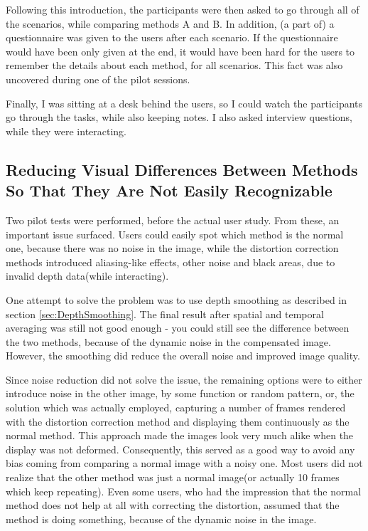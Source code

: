 \documentclass[]{article}
\begin{document}
Following this introduction, the participants were then asked to go through all of the scenarios, while comparing methods A and B. In addition, (a part of) a  questionnaire was given to the users after each scenario. If the questionnaire would have been only given at the end, it would have been hard for the users to remember the details about each method, for all scenarios. This fact was also uncovered during one of the pilot sessions.

Finally, I was sitting at a desk behind the users, so I could watch the participants go through the tasks, while also keeping notes. I also asked interview questions, while they were interacting.  

\subsection{Reducing Visual Differences Between Methods So That They Are Not Easily Recognizable}

Two pilot tests were performed, before the actual user study. From these, an important issue surfaced. Users could easily spot which method is the normal one, because there was no noise in the image, while the distortion correction methods introduced aliasing-like effects, other noise and black areas, due to invalid depth data(while interacting). 

One attempt to solve the problem was to use depth smoothing as described in section \ref{sec:DepthSmoothing}. The final result after spatial and temporal averaging was still not good enough - you could still see the difference between the two methods, because of the dynamic noise in the compensated image. However, the smoothing did reduce the overall noise and improved image quality. 

Since noise reduction did not solve the issue, the remaining options were to either introduce noise in the other image, by some function or random pattern, or, the solution which was actually employed, capturing a number of frames rendered with the distortion correction method and displaying them continuously as the normal method. This approach made the images look very much alike when the display was not deformed. Consequently, this served as a good way to avoid any bias coming from comparing a normal image with a noisy one. Most users did not realize that the other method was just a normal image(or actually 10 frames which keep repeating). Even some users, who had the impression that the normal method does not help at all with correcting the distortion, assumed that the method is doing something, because of the dynamic noise in the image.
\end{document}
